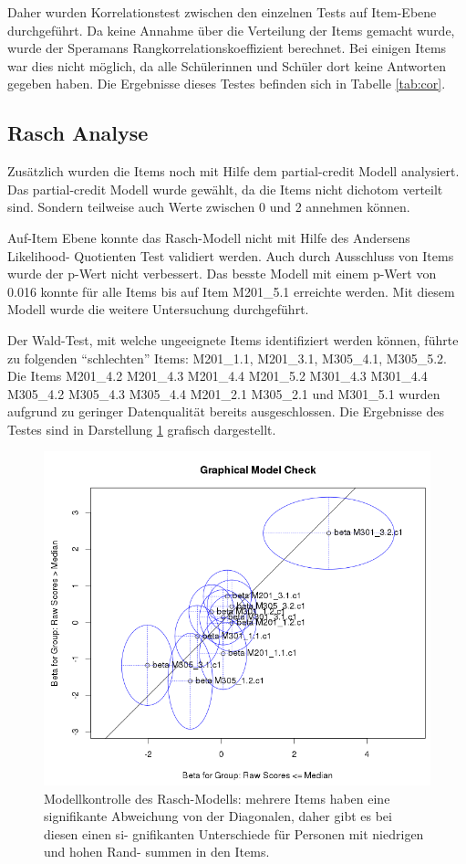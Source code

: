 Daher wurden Korrelationstest zwischen den einzelnen Tests auf Item-Ebene durchgeführt. Da keine Annahme über die Verteilung der Items gemacht wurde, wurde der Speramans Rangkorrelationskoeffizient berechnet. Bei einigen Items war dies nicht möglich, da alle Schülerinnen und Schüler dort keine Antworten gegeben haben. Die Ergebnisse dieses Testes befinden sich in Tabelle \ref{tab:cor}.

\subsection{Rasch Analyse}

Zusätzlich wurden die Items noch mit Hilfe dem partial-credit Modell analysiert. Das partial-credit Modell wurde gewählt, da die Items nicht dichotom verteilt sind. Sondern teilweise auch Werte zwischen 0 und 2 annehmen können.

Auf-Item Ebene konnte das Rasch-Modell nicht mit Hilfe des Andersens Likelihood-
Quotienten Test validiert werden. Auch durch Ausschluss von Items wurde der p-Wert nicht verbessert. Das besste Modell mit einem p-Wert von 0.016 konnte für alle Items bis auf Item M201\_5.1 erreichte werden. Mit diesem Modell wurde die weitere Untersuchung durchgeführt.

Der Wald-Test, mit welche ungeeignete Items identifiziert werden können, führte zu folgenden "`schlechten"' Items: M201\_1.1, M201\_3.1, M305\_4.1, M305\_5.2.
Die Items M201\_4.2 M201\_4.3 M201\_4.4 M201\_5.2 M301\_4.3 M301\_4.4 M305\_4.2 M305\_4.3 M305\_4.4 M201\_2.1 M305\_2.1 und M301\_5.1 wurden aufgrund zu geringer Datenqualität bereits ausgeschlossen. Die Ergebnisse des Testes sind in Darstellung \ref{fig:GOF} grafisch dargestellt.

\begin{figure}[htp]
   \centering
   \includegraphics[width=1.0\linewidth]{graphics/GOF.png}
   \caption{Modellkontrolle des Rasch-Modells: mehrere Items haben eine
   signifikante Abweichung von der Diagonalen, daher gibt es bei diesen einen si-
   gnifikanten Unterschiede für Personen mit niedrigen und hohen Rand-
   summen in den Items.}
   \label{fig:GOF}
\end{figure}


